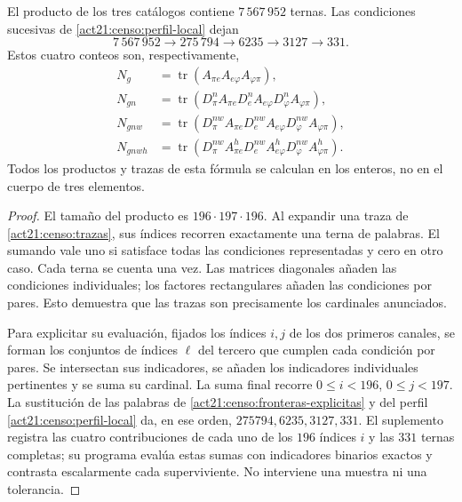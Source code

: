 \begin{theorem}
\label{act21:censo:teorema-conteo}
El producto de los tres catálogos contiene \(7\,567\,952\) ternas.
Las condiciones sucesivas de \eqref{act21:censo:perfil-local} dejan
\begin{equation}
 7\,567\,952\longrightarrow275\,794\longrightarrow6235
 \longrightarrow3127\longrightarrow331.
 \label{act21:censo:cadena-local}
\end{equation}
Estos cuatro conteos son, respectivamente,
\begin{align}
 N_g&=\operatorname{tr}(A_{\pi e}A_{e\varphi}A_{\varphi\pi}),
 \nonumber\\
 N_{gn}&=\operatorname{tr}(D_\pi^n A_{\pi e}
             D_e^n A_{e\varphi}D_\varphi^n A_{\varphi\pi}),
 \nonumber\\
 N_{gnw}&=\operatorname{tr}(D_\pi^{nw} A_{\pi e}
             D_e^{nw} A_{e\varphi}D_\varphi^{nw} A_{\varphi\pi}),
 \nonumber\\
 N_{gnwh}&=\operatorname{tr}(D_\pi^{nw} A^h_{\pi e}
             D_e^{nw} A^h_{e\varphi}D_\varphi^{nw} A^h_{\varphi\pi}).
 \label{act21:censo:trazas}
\end{align}
Todos los productos y trazas de esta fórmula se calculan en los enteros,
no en el cuerpo de tres elementos.
\end{theorem}
\begin{proof}
El tamaño del producto es \(196\cdot197\cdot196\). Al expandir
una traza de \eqref{act21:censo:trazas}, sus índices recorren exactamente una
terna de palabras. El sumando vale uno si satisface todas las condiciones
representadas y cero en otro caso. Cada terna se cuenta una vez.
Las matrices diagonales añaden las condiciones individuales; los factores
rectangulares añaden las condiciones por pares. Esto demuestra que las
trazas son precisamente los cardinales anunciados.

Para explicitar su evaluación, fijados los índices \(i,j\) de los dos
primeros canales, se forman los conjuntos de índices \(\ell\) del tercero
que cumplen cada condición por pares. Se intersectan sus indicadores,
se añaden los indicadores individuales pertinentes y se suma su cardinal.
La suma final recorre \(0\leq i<196\), \(0\leq j<197\).
La sustitución de las palabras de \eqref{act21:censo:fronteras-explicitas} y
del perfil \eqref{act21:censo:perfil-local} da, en ese orden,
\(275794,6235,3127,331\). El suplemento registra las cuatro contribuciones
de cada uno de los \(196\) índices \(i\) y las \(331\) ternas completas;
su programa evalúa estas sumas con indicadores binarios exactos y contrasta
escalarmente cada superviviente. No interviene una muestra ni una tolerancia.
\end{proof}

